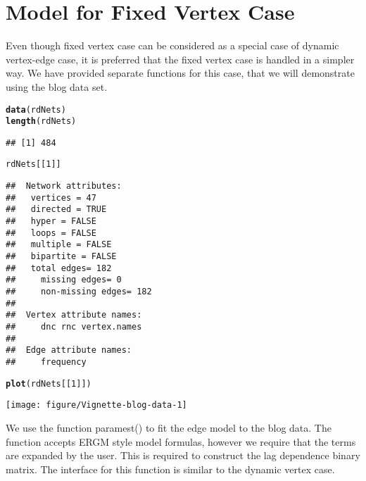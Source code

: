 \documentclass[12pt]{article}\usepackage[]{graphicx}\usepackage[]{color}
\makeatletter
\newcommand{\hlnum}[1]{\textcolor[rgb]{0.686,0.059,0.569}{#1}}%
\newcommand{\hlstd}[1]{\textcolor[rgb]{0.345,0.345,0.345}{#1}}%
\newcommand{\hlkwd}[1]{\textcolor[rgb]{0.737,0.353,0.396}{\textbf{#1}}}%
\newenvironment{kframe}{%
 \def\at@end@of@kframe{}%
 \ifinner\ifhmode%
  \def\at@end@of@kframe{\end{minipage}}%
  \begin{minipage}{\columnwidth}%
 \fi\fi%
 \def\FrameCommand##1{\hskip\@totalleftmargin \hskip-\fboxsep
 \colorbox{shadecolor}{##1}\hskip-\fboxsep
     \hskip-\linewidth \hskip-\@totalleftmargin \hskip\columnwidth}%
 \MakeFramed {\advance\hsize-\width
   \@totalleftmargin\z@ \linewidth\hsize
   \@setminipage}}%
 {\par\unskip\endMakeFramed%
 \at@end@of@kframe}
\newenvironment{knitrout}{}{} %
\makeatother
\begin{document}
\section{Model for Fixed Vertex Case}
\label{sec:model-fixed-vertex}

Even though fixed vertex case can be considered as a special case of dynamic vertex-edge case, it is preferred that the fixed vertex case is handled in a simpler way. We have provided separate functions for this case, that we will demonstrate using the blog data set.

\begin{knitrout}
\color{fgcolor}\begin{kframe}
\begin{alltt}
\hlkwd{data}\hlstd{(rdNets)}
\hlkwd{length}\hlstd{(rdNets)}
\end{alltt}
\begin{verbatim}
## [1] 484
\end{verbatim}
\begin{alltt}
\hlstd{rdNets[[}\hlnum{1}\hlstd{]]}
\end{alltt}
\begin{verbatim}
##  Network attributes:
##   vertices = 47 
##   directed = TRUE 
##   hyper = FALSE 
##   loops = FALSE 
##   multiple = FALSE 
##   bipartite = FALSE 
##   total edges= 182 
##     missing edges= 0 
##     non-missing edges= 182 
## 
##  Vertex attribute names: 
##     dnc rnc vertex.names 
## 
##  Edge attribute names: 
##     frequency
\end{verbatim}
\begin{alltt}
\hlkwd{plot}\hlstd{(rdNets[[}\hlnum{1}\hlstd{]])}
\end{alltt}
\end{kframe}

{\centering \texttt{[image: figure/Vignette-blog-data-1]} 

}



\end{knitrout}

We use the function paramest() to fit the edge model to the blog data. The function accepts ERGM style model formulas, however we require that the terms are expanded by the user. This is required to construct the lag dependence binary matrix. The interface for this function is similar to the dynamic vertex case.
\end{document}
